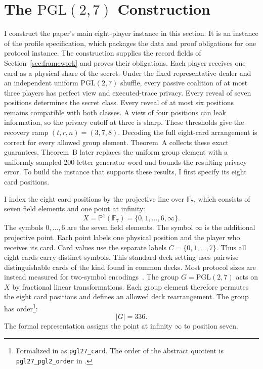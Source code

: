 \documentclass[runningheads]{llncs}
\newcommand{\coqin}[1]{\texttt{#1}}
\newcommand{\PG}{\mathrm{PGL}(2,7)}
\begin{document}
\section{The \texorpdfstring{$\PG$}{PGL(2,7)} Construction}\label{sec:pgl}

I construct the paper's main eight-player instance in this section. It is an
instance of the profile specification, which packages the data and proof
obligations for one protocol instance. The construction supplies the record
fields of Section~\ref{sec:framework} and proves their obligations. Each
player receives one card as a physical share of the secret. Under the fixed
representative dealer and an independent uniform $\PG$ shuffle, every passive
coalition of at most three players has perfect view and executed-trace
privacy. Every reveal of seven positions determines the secret class. Every
reveal of at most six positions remains compatible with both classes. A view
of four positions can leak information, so the privacy cutoff at three is
sharp. These thresholds give the recovery ramp $(t,r,n)=(3,7,8)$. Decoding the
full eight-card arrangement is correct for every allowed group element.
Theorem~A collects these exact guarantees. Theorem~B later replaces the
uniform group element with a uniformly sampled 200-letter generator word and
bounds the resulting privacy error. To build the instance that supports these
results, I first specify its eight card positions.

I index the eight card positions by the projective line over $\mathbb{F}_7$,
which consists of seven field elements and one point at infinity:
\[
  X=\mathbb{P}^1(\mathbb{F}_7)=\{0,1,\ldots,6,\infty\}.
\]
The symbols $0,\ldots,6$ are the seven field elements. The symbol $\infty$ is
the additional projective point. Each point labels one physical position and
the player who receives its card. Card values use the separate labels
$C=\{0,1,\ldots,7\}$. Thus all eight cards carry distinct symbols. This
standard-deck setting uses pairwise distinguishable cards of the kind found in
common decks. Most protocol sizes are instead measured for two-symbol
encodings~\cite{NiemiRenvall1999,Koch2019}. The group $G=\PG$ acts on $X$ by
fractional linear transformations. Each group element therefore permutes the
eight card positions and defines an allowed deck rearrangement. The group has
order\footnote{Formalized in
 as \coqin{pgl27\_card}. The
order of the abstract quotient is \coqin{pgl27\_pgl2\_order} in
.}:
\begin{equation}
  \lvert G\rvert=336.
  \label{eq:pgl-order}
\end{equation}
The formal representation assigns the point at infinity $\infty$ to position
seven.
\end{document}
